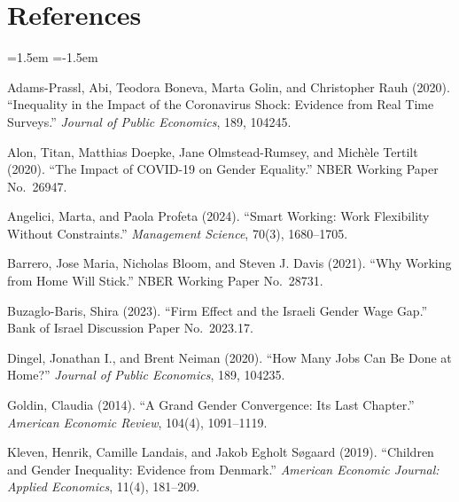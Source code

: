 \documentclass[11pt]{article}
\begin{document}
\newpage
\section*{References}
\begin{list}{}{\leftmargin=1.5em \itemindent=-1.5em}

\item Adams-Prassl, Abi, Teodora Boneva, Marta Golin, and Christopher Rauh (2020). ``Inequality in the Impact of the Coronavirus Shock: Evidence from Real Time Surveys.'' \textit{Journal of Public Economics}, 189, 104245.

\item Alon, Titan, Matthias Doepke, Jane Olmstead-Rumsey, and Mich\`{e}le Tertilt (2020). ``The Impact of COVID-19 on Gender Equality.'' NBER Working Paper No.\ 26947.

\item Angelici, Marta, and Paola Profeta (2024). ``Smart Working: Work Flexibility Without Constraints.'' \textit{Management Science}, 70(3), 1680--1705.

\item Barrero, Jose Maria, Nicholas Bloom, and Steven J. Davis (2021). ``Why Working from Home Will Stick.'' NBER Working Paper No.\ 28731.

\item Buzaglo-Baris, Shira (2023). ``Firm Effect and the Israeli Gender Wage Gap.'' Bank of Israel Discussion Paper No.\ 2023.17.

\item Dingel, Jonathan I., and Brent Neiman (2020). ``How Many Jobs Can Be Done at Home?'' \textit{Journal of Public Economics}, 189, 104235.

\item Goldin, Claudia (2014). ``A Grand Gender Convergence: Its Last Chapter.'' \textit{American Economic Review}, 104(4), 1091--1119.

\item Kleven, Henrik, Camille Landais, and Jakob Egholt S\o{}gaard (2019). ``Children and Gender Inequality: Evidence from Denmark.'' \textit{American Economic Journal: Applied Economics}, 11(4), 181--209.


\end{list}
\end{document}
